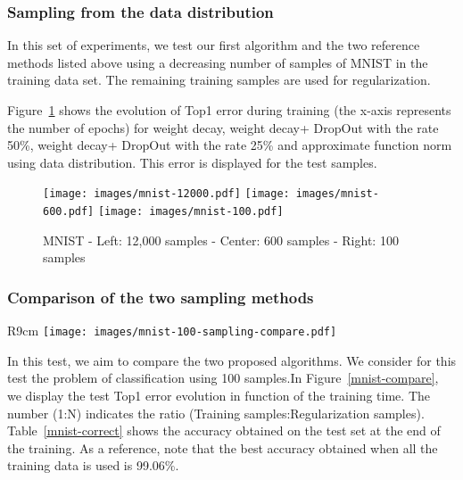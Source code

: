 \documentclass{article}
\begin{document}
\subsubsection{Sampling from the data distribution}
In this set of experiments, we test our first algorithm and the two reference methods listed above using a decreasing number of samples of MNIST in the training data set. The remaining training samples are used for regularization. 


Figure~\ref{reg-im-MNIST} shows the evolution of Top1 error during training (the x-axis represents the number of epochs) for weight decay, weight decay+ DropOut with the rate 50\%, weight decay+ DropOut with the rate 25\% and approximate function norm using data distribution. This error is displayed for the  test samples.
\begin{figure}[ht!]
\centering
\texttt{[image: images/mnist-12000.pdf]} \hfill 
\texttt{[image: images/mnist-600.pdf]} \hfill
\texttt{[image: images/mnist-100.pdf]}
\caption{MNIST - Left: 12,000 samples - Center: 600 samples - Right: 100 samples}
\label{reg-im-MNIST}
\end{figure}

%
%

\subsubsection{Comparison of the two sampling methods}
\begin{wrapfigure}{R}{9cm}
\centering
\texttt{[image: images/mnist-100-sampling-compare.pdf]}
\caption{MNIST - Sampling method comparison -  Test Top1-error evolution in time}
\label{mnist-compare}
\end{wrapfigure}
In this test, we aim to compare the two proposed algorithms. We consider for this test the problem of classification using 100 samples.In Figure~\ref{mnist-compare}, we display the test Top1 error evolution in function of the training time. The number (1:N) indicates the ratio (Training samples:Regularization samples). Table~\ref{mnist-correct} shows the accuracy obtained on the test set at the end of the training. As a reference, note that the best accuracy obtained when all the training data is used is 99.06\%.
\end{document}
